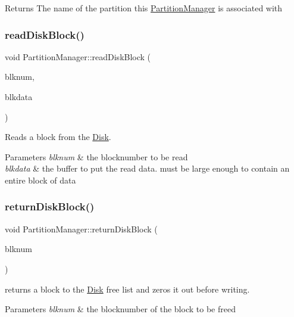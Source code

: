 \begin{DoxyReturn}{Returns}
The name of the partition this \mbox{\hyperlink{class_partition_manager}{Partition\+Manager}} is associated with 
\end{DoxyReturn}
\mbox{\label{class_partition_manager_a7aca34c24770b7b9290c489475655ada}} 
\subsubsection{\texorpdfstring{read\+Disk\+Block()}{readDiskBlock()}}
{\footnotesize\ttfamily void Partition\+Manager\+::read\+Disk\+Block (\begin{DoxyParamCaption}\item[{Blk\+Num\+Type}]{blknum,  }\item[{char $\ast$}]{blkdata }\end{DoxyParamCaption})}

Reads a block from the \mbox{\hyperlink{class_disk}{Disk}}. 
\begin{DoxyParams}{Parameters}
{\em blknum} & the blocknumber to be read \\
\hline
{\em blkdata} & the buffer to put the read data. must be large enough to contain an entire block of data \\
\hline
\end{DoxyParams}
\mbox{\label{class_partition_manager_a3ce9b50aa5e7d9063919fc55d125246b}} 
\subsubsection{\texorpdfstring{return\+Disk\+Block()}{returnDiskBlock()}}
{\footnotesize\ttfamily void Partition\+Manager\+::return\+Disk\+Block (\begin{DoxyParamCaption}\item[{Blk\+Num\+Type}]{blknum }\end{DoxyParamCaption})}

returns a block to the \mbox{\hyperlink{class_disk}{Disk}} free list and zeros it out before writing. 
\begin{DoxyParams}{Parameters}
{\em blknum} & the blocknumber of the block to be freed \\
\hline
\end{DoxyParams}
\mbox{\label{class_partition_manager_a114d5d4f8d90b6e9207b09d99e246bed}} 
